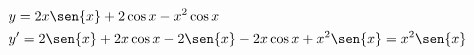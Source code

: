 \begin{ex}
\begin{align}
&y=2x\sen{x}+2\cos{x}-x^2\cos{x}\nonumber\\
&y'=2\sen{x}+2x\cos{x}-2\sen{x}-2x\cos{x}+x^2\sen{x}=x^2\sen{x}\nonumber
\end{align}
\end{ex}